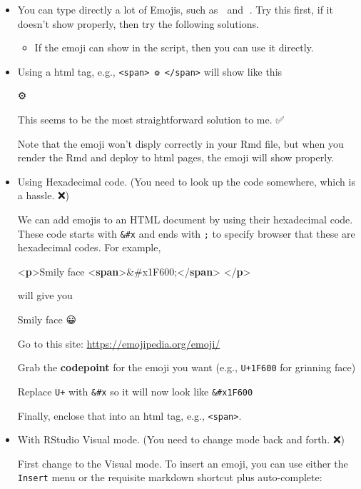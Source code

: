 \documentclass[
]{book}
\newenvironment{Shaded}{\begin{snugshade}}{\end{snugshade}}
\newcommand{\DataTypeTok}[1]{\textcolor[rgb]{0.13,0.29,0.53}{#1}}
\newcommand{\DecValTok}[1]{\textcolor[rgb]{0.00,0.00,0.81}{#1}}
\newcommand{\KeywordTok}[1]{\textcolor[rgb]{0.13,0.29,0.53}{\textbf{#1}}}
\newcommand{\NormalTok}[1]{#1}
\providecommand{\tightlist}{%
  \setlength{\itemsep}{0pt}\setlength{\parskip}{0pt}}
\begin{document}
\begin{itemize}
\item
  You can type directly a lot of Emojis, such as ️🙏 and 🤣. Try this first, if it doesn't show properly, then try the following solutions.

  \begin{itemize}
  \tightlist
  \item
    If the emoji can show in the script, then you can use it directly.
  \end{itemize}
\item
  Using a html tag, e.g., \texttt{\textless{}span\textgreater{}\ ⚙️\ \textless{}/span\textgreater{}} will show like this

  { ⚙️ }

  This seems to be the most straightforward solution to me. ✅

  Note that the emoji won't disply correctly in your Rmd file, but when you render the Rmd and deploy to html pages, the emoji will show properly.
\item
  Using Hexadecimal code. (You need to look up the code somewhere, which is a hassle. ❌)

  We can add emojis to an HTML document by using their hexadecimal code. These code starts with \texttt{\&\#x} and ends with \texttt{;} to specify browser that these are hexadecimal codes. For example,

\begin{Shaded}
\begin{Highlighting}[]
\DataTypeTok{\textless{}}\KeywordTok{p}\DataTypeTok{\textgreater{}}\NormalTok{Smily face }\DataTypeTok{\textless{}}\KeywordTok{span}\DataTypeTok{\textgreater{}}\DecValTok{\&\#x1F600;}\DataTypeTok{\textless{}/}\KeywordTok{span}\DataTypeTok{\textgreater{}} \DataTypeTok{\textless{}/}\KeywordTok{p}\DataTypeTok{\textgreater{}}
\end{Highlighting}
\end{Shaded}

  will give you

  Smily face {😀}

  Go to this site: \url{https://emojipedia.org/emoji/}

  Grab the \textbf{codepoint} for the emoji you want (e.g., \texttt{U+1F600} for grinning face)

  Replace \texttt{U+} with \texttt{\&\#x} so it will now look like \texttt{\&\#x1F600}

  Finally, enclose that into an html tag, e.g., \texttt{\textless{}span\textgreater{}}.
\item
  With RStudio Visual mode. (You need to change mode back and forth. ❌)

  First change to the Visual mode. To insert an emoji, you can use either the \texttt{Insert} menu or the requisite markdown shortcut plus auto-complete:
\end{itemize}
\end{document}
